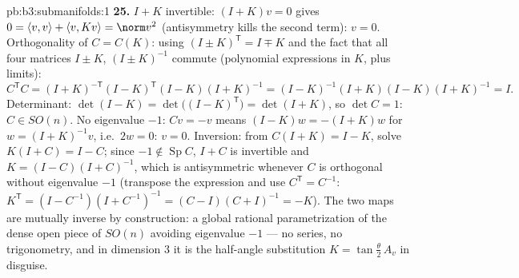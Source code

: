 \begin{solution}{pb:b3:submanifolds:1}
\textbf{25.} $I + K$ invertible: $(I + K)v = 0$ gives $0 =
\langle v, v\rangle + \langle v, Kv\rangle = \norm v^2$
(antisymmetry kills the second term): $v = 0$. Orthogonality
of $C = C(K)$: using $(I \pm K)^{\mathsf T} = I \mp K$ and
the fact that all four matrices $I \pm K$, $(I \pm K)^{-1}$
commute (polynomial expressions in $K$, plus limits):
\[
C^{\mathsf T}C = (I + K)^{-\mathsf T}(I - K)^{\mathsf T}
(I - K)(I + K)^{-1}
= (I - K)^{-1}(I + K)(I - K)(I + K)^{-1} = I .
\]
Determinant: $\det(I - K) = \det\bigl((I - K)^{\mathsf
T}\bigr) = \det(I + K)$, so $\det C = 1$: $C \in SO(n)$.
No eigenvalue $-1$: $Cv = -v$ means $(I - K)w = -(I + K)w$
for $w = (I + K)^{-1}v$, i.e.\ $2w = 0$: $v = 0$.
Inversion: from $C(I + K) = I - K$, solve $K(I + C) = I -
C$; since $-1 \notin \operatorname{Sp}C$, $I + C$ is
invertible and $K = (I - C)(I + C)^{-1}$, which is
antisymmetric whenever $C$ is orthogonal without eigenvalue
$-1$ (transpose the expression and use $C^{\mathsf T} =
C^{-1}$: $K^{\mathsf T} = (I - C^{-1})(I + C^{-1})^{-1} =
(C - I)(C + I)^{-1} = -K$). The two maps are mutually
inverse by construction: a global rational parametrization
of the dense open piece of $SO(n)$ avoiding eigenvalue $-1$
--- no series, no trigonometry, and in dimension $3$ it is
the half-angle substitution $K = \tan\frac\theta2\,A_v$ in
disguise.
\end{solution}
